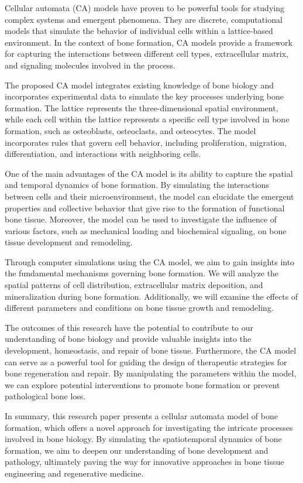 \documentclass[conference]{IEEEtran}
\begin{document}
Cellular automata (CA) models have proven to be powerful tools for studying complex systems and emergent phenomena. They are discrete, computational models that simulate the behavior of individual cells within a lattice-based environment. In the context of bone formation, CA models provide a framework for capturing the interactions between different cell types, extracellular matrix, and signaling molecules involved in the process.

The proposed CA model integrates existing knowledge of bone biology and incorporates experimental data to simulate the key processes underlying bone formation. The lattice represents the three-dimensional spatial environment, while each cell within the lattice represents a specific cell type involved in bone formation, such as osteoblasts, osteoclasts, and osteocytes. The model incorporates rules that govern cell behavior, including proliferation, migration, differentiation, and interactions with neighboring cells.

One of the main advantages of the CA model is its ability to capture the spatial and temporal dynamics of bone formation. By simulating the interactions between cells and their microenvironment, the model can elucidate the emergent properties and collective behavior that give rise to the formation of functional bone tissue. Moreover, the model can be used to investigate the influence of various factors, such as mechanical loading and biochemical signaling, on bone tissue development and remodeling.

Through computer simulations using the CA model, we aim to gain insights into the fundamental mechanisms governing bone formation. We will analyze the spatial patterns of cell distribution, extracellular matrix deposition, and mineralization during bone formation. Additionally, we will examine the effects of different parameters and conditions on bone tissue growth and remodeling.

The outcomes of this research have the potential to contribute to our understanding of bone biology and provide valuable insights into the development, homeostasis, and repair of bone tissue. Furthermore, the CA model can serve as a powerful tool for guiding the design of therapeutic strategies for bone regeneration and repair. By manipulating the parameters within the model, we can explore potential interventions to promote bone formation or prevent pathological bone loss.

In summary, this research paper presents a cellular automata model of bone formation, which offers a novel approach for investigating the intricate processes involved in bone biology. By simulating the spatiotemporal dynamics of bone formation, we aim to deepen our understanding of bone development and pathology, ultimately paving the way for innovative approaches in bone tissue engineering and regenerative medicine.
\end{document}
